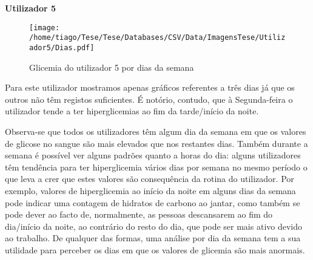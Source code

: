 \textbf{Utilizador 5}

\begin{figure}[H]
\centering
\texttt{[image: /home/tiago/Tese/Tese/Databases/CSV/Data/ImagensTese/Utilizador5/Dias.pdf]}
\caption{Glicemia do utilizador 5 por dias da semana}
\label{fig:dias5}
\end{figure}
Para este utilizador mostramos apenas gráficos referentes a três dias já que os outros não têm registos suficientes. É notório, contudo, que à Segunda-feira o utilizador tende a ter hiperglicemias ao fim da tarde/início da noite.\newline

Observa-se que todos os utilizadores têm algum dia da semana em que os valores de glicose no sangue são mais elevados que nos restantes dias. Também durante a semana é possível ver alguns padrões quanto a horas do dia: alguns utilizadores têm tendência para ter hiperglicemia vários dias por semana no mesmo período o que leva a crer que estes valores são consequência da rotina do utilizador. Por exemplo, valores de hiperglicemia ao início da noite em alguns dias da semana pode indicar uma contagem de hidratos de carbono ao jantar, como também se pode dever ao facto de, normalmente, as pessoas descansarem ao fim do dia/início da noite, ao contrário do resto do dia, que pode ser mais ativo devido ao trabalho. De qualquer das formas, uma análise por dia da semana tem a sua utilidade para perceber os dias em que os valores de glicemia são mais anormais.



